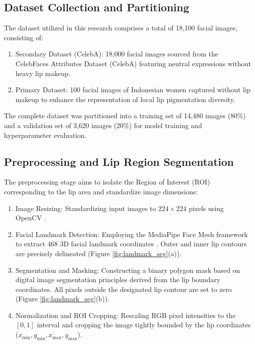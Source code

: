 \documentclass[10pt,a4paper]{article}
\begin{document}
\subsection{Dataset Collection and Partitioning}
The dataset utilized in this research comprises a total of 18,100 facial images, consisting of:
\begin{enumerate}
    \item Secondary Dataset (CelebA): 18,000 facial images sourced from the CelebFaces Attributes Dataset (CelebA) \cite{liu2015deep} featuring neutral expressions without heavy lip makeup.
    \item Primary Dataset: 100 facial images of Indonesian women captured without lip makeup to enhance the representation of local lip pigmentation diversity.
\end{enumerate}
The complete dataset was partitioned into a training set of 14,480 images (80\%) and a validation set of 3,620 images (20\%) for model training and hyperparameter evaluation.

\subsection{Preprocessing and Lip Region Segmentation}
The preprocessing stage aims to isolate the Region of Interest (ROI) corresponding to the lip area and standardize image dimensions:
\begin{enumerate}
    \item Image Resizing: Standardizing input images to $224 \times 224$ pixels using OpenCV \cite{bradski2000opencv}.
    \item Facial Landmark Detection: Employing the MediaPipe Face Mesh framework to extract 468 3D facial landmark coordinates \cite{lugaresi2019mediapipe}. Outer and inner lip contours are precisely delineated (Figure \ref{fig:landmark_seg}(a)).
    \item Segmentation and Masking: Constructing a binary polygon mask based on digital image segmentation principles \cite{otsu1979threshold, gonzalez2018digital} derived from the lip boundary coordinates. All pixels outside the designated lip contour are set to zero (Figure \ref{fig:landmark_seg}(b)).
    \item Normalization and ROI Cropping: Rescaling RGB pixel intensities to the $[0, 1]$ interval and cropping the image tightly bounded by the lip coordinates ($x_{\min}, y_{\min}, x_{\max}, y_{\max}$).
\end{enumerate}
\end{document}

